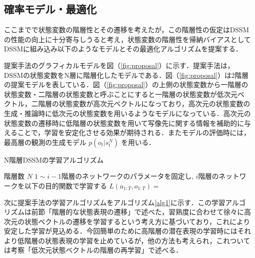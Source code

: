 \documentclass[10pt, twocolumn]{jarticle}
\begin{document}
\subsection{確率モデル・最適化}

ここまでで状態変数の階層性とその遷移を考えたが，この階層性の仮定はDSSMの性能の向上に十分寄与しうると考え，状態変数の階層性を帰納バイアスとしてDSSMに組み込み以下のようなモデルとその最適化アルゴリズムを提案する．

\vspace{\baselineskip}
提案手法のグラフィカルモデルを図（\ref{fig:proposal}）に示す．提案手法は，DSSMの状態変数をN層に階層化したモデルである．図（\ref{fig:proposal}）は2階層の提案モデルを表している．図（\ref{fig:proposal}）の上側の状態変数から一階層の状態変数・二階層の状態変数と呼ぶことにすると一階層の状態変数が低次元ベクトル，二階層の状態変数が高次元ベクトルになっており，高次元の状態変数の生成・推論時に低次元の状態変数を用いるようなモデルになっている．高次元の状態変数の遷移時に低階層の状態変数を用いて写像先に関する情報を補助的に与えることで，学習を安定化させる効果が期待される．またモデルの評価時には，最高層の観測の生成モデル $p(o_t|s^N_t)$ を用いる．

\begin{algorithm}[tbp]               
  \caption{N階層DSSMの学習アルゴリズム}
  \label{alg1}
  \begin{algorithmic}
    \REQUIRE 階層数 $N$ 
        \STATE $1 \sim i-1$階層のネットワークのパラメータを固定し, 
        \STATE $i$階層のネットワークを以下の目的関数で学習する
        \STATE $L(a_{1:T}, o_{1:T}) = $
      \ENDWHILE
    \ENDFOR
  \end{algorithmic}
\end{algorithm}

\vspace{\baselineskip}
次に提案手法の学習アルゴリズムをアルゴリズム\ref{alg1}に示す．この学習アルゴリズムは前節「階層的な状態表現の遷移」で述べた，習熟度に合わせて徐々に高次元の状態ベクトルの遷移を学習するという考え方に基づいており，これにより安定した学習が見込める．今回簡単のために高階層の潜在表現の学習時にはそれより低階層の状態表現の学習を止めているが，他の方法も考えられ，これついては考察「低次元状態ベクトルの階層の再学習」で述べる．
\end{document}
